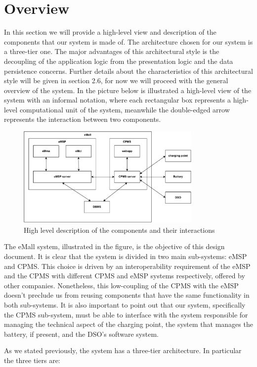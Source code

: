 \section{Overview}
In this section we will provide a high-level view and description of the components that our system is made of. The architecture chosen for our system is a three-tier one. The major advantages of this architectural style is the decoupling of the application logic from the presentation logic and the data persistence concerns. Further details about the characteristics of this architectural style will be given in section 2.6, for now we will proceed with the general overview of the system. In the picture below is illustrated a high-level view of the system with an informal notation, where each rectangular box represents a high-level computational unit of the system, meanwhile the double-edged arrow represents 
 the interaction between two components. \\
\begin{figure}[H]
    \centering
    \includegraphics[width=0.8\textwidth]{Images/cp2/overview.pdf}
    \caption{High level description of the components and their interactions}
\end{figure}

\par
The eMall system, illustrated in the figure, is the objective of this design document. It is clear that the system is divided in two main sub-systems: eMSP and CPMS. This choice is driven by an interoperability requirement of the eMSP and the CPMS with different CPMS and eMSP systems respectively, offered by other companies. Nonetheless, this low-coupling of the CPMS with the eMSP doesn't preclude us from reusing components that have the same functionality in both sub-systems. It is also important to point out that our system, specifically the CPMS sub-system, must be able to interface with the system responsible for managing the technical aspect of the charging point, the system that manages the battery, if present, and the DSO's software system.
\par
As we stated previously, the system has a three-tier architecture. In particular the three tiers are:

